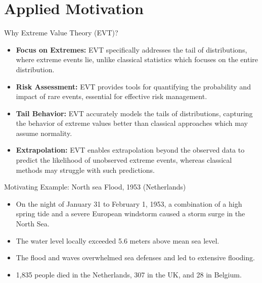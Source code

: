 \documentclass[10pt, hyperref={colorlinks = true,linkcolor = blue}]{beamer}
\begin{document}
\section[Motivation]{Applied Motivation}
{

\begin{frame}{Why Extreme Value Theory (EVT)?}
\begin{itemize}
\item \textbf{Focus on Extremes:} EVT specifically addresses the tail of distributions, where extreme events lie, unlike classical statistics which focuses on the entire distribution.
\item \textbf{Risk Assessment:} EVT provides tools for quantifying the probability and impact of rare events, essential for effective risk management.
\item  \textbf{Tail Behavior:} EVT accurately models the tails of distributions, capturing the behavior of extreme values better than classical approaches which may assume normality.
\item  \textbf{Extrapolation:} EVT enables extrapolation beyond the observed data to predict the likelihood of unobserved extreme events, whereas classical methods may struggle with such predictions.
\end{itemize}
\end{frame}

\begin{frame}{Motivating Example: North sea Flood, 1953 (Netherlands)}
\begin{itemize}
    \item On the night of January 31 to February 1, 1953, a combination of a high spring tide and a severe European windstorm caused a storm surge in the North Sea.
    \item The water level locally exceeded 5.6 meters above mean sea level.
    \item The flood and waves overwhelmed sea defenses and led to extensive flooding.
    \item 1,835 people died in the Netherlands, 307 in the UK, and 28 in Belgium.
\end{itemize}
\end{frame}


}
\end{document}
